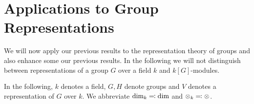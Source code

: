 \section{Applications to Group Representations}


\begin{fluff}
  We will now apply our previous results to the representation theory of groups and also enhance some our previous results.
  In the following we will not distinguish between representations of a group $G$ over a field $k$ and $k[G]$-modules.
\end{fluff}


\begin{conventions}
  In the following, $k$ denotes a field, $G, H$ denote groups and $V$ denotes a representation of $G$ over $k$.
  We abbreviate $\dim_k \eqqcolon \dim$ and $\mathbin{\otimes}_k \eqqcolon \mathbin{\otimes}$.
\end{conventions}









